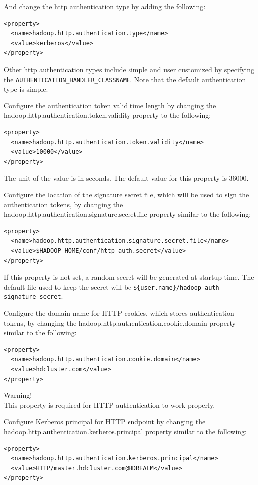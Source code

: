 And change the http authentication type by adding the following:
\lstset{style=bashstyle}
\begin{lstlisting}
<property>
  <name>hadoop.http.authentication.type</name>
  <value>kerberos</value>
</property>
\end{lstlisting}

Other http authentication types include simple and user customized by specifying the \verb|AUTHENTICATION_HANDLER_CLASSNAME|. Note that the default authentication type is simple.

Configure the authentication token valid time length by changing the hadoop.http.authentication.token.validity property to the following:
\lstset{style=bashstyle}
\begin{lstlisting}
<property>
  <name>hadoop.http.authentication.token.validity</name>
  <value>10000</value>
</property>
\end{lstlisting}

The unit of the value is in seconds.  The default value for this property is 36000.

Configure the location of the signature secret file, which will be used to sign the authentication tokens, by changing the  hadoop.http.authentication.signature.secret.file property similar to the following:
\lstset{style=bashstyle}
\begin{lstlisting}
<property>
  <name>hadoop.http.authentication.signature.secret.file</name>
  <value>$HADOOP_HOME/conf/http-auth.secret</value>
</property>
\end{lstlisting}

If this property is not set, a random secret will be generated at startup time. The default file used to keep the secret will be \verb|${user.name}/hadoop-auth-signature-secret|.

Configure the domain name for HTTP cookies, which stores authentication tokens, by changing the hadoop.http.authentication.cookie.domain property similar to the following:
\lstset{style=bashstyle}
\begin{lstlisting}
<property>
  <name>hadoop.http.authentication.cookie.domain</name>
  <value>hdcluster.com</value>
</property>
\end{lstlisting}
\begin{warning}
Warning! \\
This property is required for HTTP authentication to work properly.
\end{warning}

Configure Kerberos principal for HTTP endpoint by changing the hadoop.http.authentication.kerberos.principal property similar to the following:
\lstset{style=bashstyle}
\begin{lstlisting}
<property>
  <name>hadoop.http.authentication.kerberos.principal</name>
  <value>HTTP/master.hdcluster.com@HDREALM</value>
</property>
\end{lstlisting}

